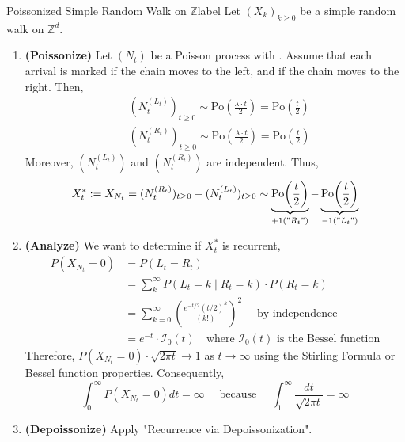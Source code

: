 \documentclass{tufte-handout}
\begin{document}
\begin{ex}{Poissonized Simple Random Walk on $\mathbb{Z}$}{label}
  Let $(X_k)_{k \geq 0}$ be a simple random walk on $\mathbb{Z}^d$.
    \begin{enumerate}
    \item \textbf{(Poissonize)} Let $(N_t)$ be a Poisson process with . Assume that each arrival is marked  if the chain moves to the left, and  if the chain moves to the right. Then,
    \begin{align*}
      &(N_t^{(L_t)})_{t \geq 0} \sim \text{Po}\left(\frac{\lambda \cdot t}{2}\right) = \text{Po}\left(\frac{t}{2}\right) \\
      &(N_t^{(R_t)})_{t \geq 0} \sim \text{Po}\left(\frac{\lambda \cdot t}{2}\right) = \text{Po}\left(\frac{t}{2}\right)
    \end{align*}
    \noindent Moreover, $(N_t^{(L_t)})$ and $(N_t^{(R_t)})$ are independent. Thus,
    \[X^*_t := X_{N_t} =  (N_t^{(R_t)})_{t \geq 0} - (N_t^{(L_t)})_{t \geq 0} \sim \underbrace{\text{Po}\bigg(\frac{t}{2}\bigg)}_{+1 ("R_t")} - \underbrace{\text{Po}\bigg(\frac{t}{2}\bigg)}_{-1 ("L_t")}\]

    \item \textbf{(Analyze)} We want to determine if $X^*_t$ is recurrent,
    \begin{align*}
      P\left(X_{N_{t}}=0\right) &= P(L_t = R_t) \\
                                  &= \sum_k^{\infty} P(L_t = k \mid R_t = k) \cdot P(R_t = k) \\
                                  &= \sum_{k=0}^{\infty}\left(\frac{e^{-t / 2}(t / 2)^{k}}{(k !)}\right)^{2} \quad \text{ by independence} \\
                                  &= e^{-t} \cdot \mathcal{I}_0(t) \quad \text{where $\mathcal{I}_0(t)$ is the Bessel function}
    \end{align*}
    \noindent Therefore, $P(X_{N_t} = 0) \cdot \sqrt{2\pi t} \rightarrow 1$ as $t \rightarrow \infty$ using the Stirling Formula or Bessel function properties. Consequently,
    \[\int_{0}^{\infty} P\left(X_{N_{t}}=0\right) d t=\infty \quad \text { because } \quad \int_{1}^{\infty} \frac{d t}{\sqrt{2 \pi t}}=\infty\]
    \item \textbf{(Depoissonize)} Apply "Recurrence via Depoissonization".
  \end{enumerate}
\end{ex}
\end{document}
